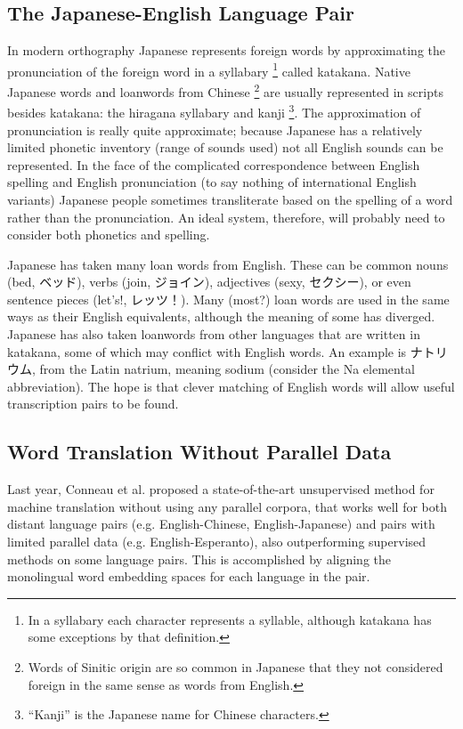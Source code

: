 \documentclass{article}
\begin{document}
\subsection*{The Japanese-English Language Pair}

In modern orthography
Japanese represents foreign words
by approximating the pronunciation of the foreign word
in a syllabary \footnote{In a syllabary each character represents a syllable,
although katakana has some exceptions by that definition.} called katakana.
Native Japanese words and loanwords from Chinese
\footnote{Words of Sinitic origin are so common in Japanese that they not considered
  foreign in the same sense as words from English.}
are usually represented in scripts besides katakana:
the hiragana syllabary and kanji
\footnote{``Kanji'' is the Japanese name for Chinese characters.}.
The approximation of pronunciation is really quite approximate;
because Japanese has a relatively limited phonetic inventory (range of sounds used)
not all English sounds can be represented.
In the face of the complicated correspondence
between English spelling and English pronunciation
(to say nothing of international English variants)
Japanese people sometimes transliterate based on the spelling of a word
rather than the pronunciation.
An ideal system,
therefore,
will probably need to consider both phonetics and spelling.

Japanese has taken many loan words from English.
These can be common nouns (bed, ベッド),
verbs (join, ジョイン),
adjectives (sexy, セクシー),
or even sentence pieces (let's!, レッツ！).
Many (most?) loan words
are used in the same ways as their English equivalents,
although the meaning of some has diverged.
Japanese has also taken loanwords from other languages
that are written in katakana,
some of which may conflict with English words.
An example is ナトリウム,
from the Latin natrium,
meaning sodium (consider the Na elemental abbreviation).
The hope is that clever matching of English words
will allow useful transcription pairs to be found.

\subsection*{Word Translation Without Parallel Data}

Last year, Conneau et al. proposed a state-of-the-art unsupervised method for machine
translation without using any parallel corpora, that works well for both distant
language pairs (e.g. English-Chinese, English-Japanese) and pairs with limited parallel
data (e.g. English-Esperanto), also outperforming supervised methods on some language
pairs. This is accomplished by aligning the monolingual word embedding spaces for each
language in the pair.
\end{document}

